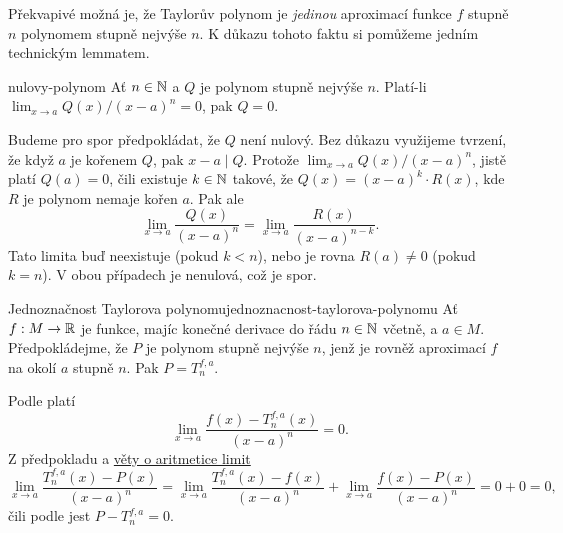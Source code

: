 Překvapivé možná je, že Taylorův polynom je \emph{jedinou} aproximací funkce $f$
stupně $n$ polynomem stupně nejvýše $n$. K důkazu tohoto faktu si pomůžeme
jedním technickým lemmatem.

\begin{lemma}{}{nulovy-polynom}
 Ať $n \in \mathbb{N}$ a $Q$ je polynom stupně nejvýše $n$. Platí-li $\lim_{x \to a}
 Q(x) / (x-a)^{n} = 0$, pak $Q = 0$.
\end{lemma}

\begin{lemproof}
 Budeme pro spor předpokládat, že $Q$ není nulový. Bez důkazu využijeme tvrzení,
 že když $a$ je kořenem $Q$, pak $x - a \mid Q$. Protože $\lim_{x \to a} Q(x) /
 (x-a)^{n}$, jistě platí $Q(a) = 0$, čili existuje $k \in \mathbb{N}$ takové, že $Q(x) =
 (x-a)^{k} \cdot R(x)$, kde $R$ je polynom nemaje kořen $a$. Pak ale
 \[
  \lim_{x \to a} \frac{Q(x)}{(x-a)^{n}} = \lim_{x \to a}
  \frac{R(x)}{(x-a)^{n-k}}.
 \]
 Tato limita buď neexistuje (pokud $k < n$), nebo je rovna $R(a) \neq 0$ (pokud
 $k = n$). V obou případech je nenulová, což je spor.
\end{lemproof}

\begin{theorem}{Jednoznačnost Taylorova polynomu}{jednoznacnost-taylorova-polynomu}
 Ať $f:M \to \mathbb{R}$ je funkce, majíc konečné derivace do řádu $n \in \mathbb{N}$ včetně, a
 $a \in M$. Předpokládejme, že $P$ je polynom stupně nejvýše $n$, jenž je rovněž
 aproximací $f$ na okolí $a$ stupně $n$. Pak $P = T^{f,a}_n$.
\end{theorem}
\begin{thmproof}
 Podle  platí
 \[
  \lim_{x \to a} \frac{f(x) - T^{f,a}_n(x)}{(x-a)^{n}} = 0.
 \]
 Z předpokladu a \hyperref[thm:aritmetika-limit]{věty o aritmetice limit}
 \[
  \lim_{x \to a} \frac{T^{f,a}_n(x) - P(x)}{(x-a)^{n}} = \lim_{x \to a}
  \frac{T^{f,a}_n(x) - f(x)}{(x-a)^{n}} + \lim_{x \to a} \frac{f(x) -
  P(x)}{(x-a)^{n}} = 0 + 0 = 0,
 \]
 čili podle  jest $P - T^{f,a}_n = 0$. 
\end{thmproof}

